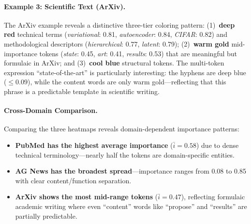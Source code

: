 \paragraph{Example 3: Scientific Text (ArXiv).}

\vspace{4pt}
\noindent
{}
\vspace{4pt}

\noindent The ArXiv example reveals a distinctive three-tier coloring pattern: (1)~{\textcolor{imp8}{\textbf{deep red}}} technical terms (\emph{variational}: 0.81, \emph{autoencoder}: 0.84, \emph{CIFAR}: 0.82) and methodological descriptors (\emph{hierarchical}: 0.77, \emph{latent}: 0.79); (2)~{\textcolor{imp5}{\textbf{warm gold}}} mid-importance tokens (\emph{state}: 0.45, \emph{art}: 0.41, \emph{results}: 0.53) that are meaningful but formulaic in ArXiv; and (3)~{\textcolor{imp1}{\textbf{cool blue}}} structural tokens. The multi-token expression ``state-of-the-art'' is particularly interesting: the hyphens are deep blue ($\leq 0.09$), while the content words are only warm gold---reflecting that this phrase is a predictable template in scientific writing.

\paragraph{Cross-Domain Comparison.} Comparing the three heatmaps reveals domain-dependent importance patterns:
\begin{itemize}[leftmargin=*,itemsep=2pt]
    \item \textbf{PubMed has the highest average importance} ($\bar{i} = 0.58$) due to dense technical terminology---nearly half the tokens are domain-specific entities.
    \item \textbf{AG News has the broadest spread}---importance ranges from 0.08 to 0.85 with clear content/function separation.
    \item \textbf{ArXiv shows the most mid-range tokens} ($\bar{i} = 0.47$), reflecting formulaic academic writing where even ``content'' words like ``propose'' and ``results'' are partially predictable.
\end{itemize}


